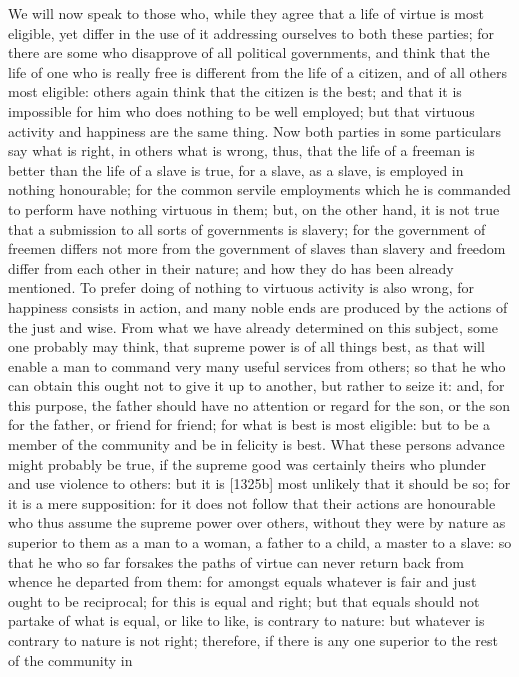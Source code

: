 We will now speak to those who, while they agree that a life of virtue is
most eligible, yet differ in the use of it addressing ourselves to both
these parties; for there are some who disapprove of all political
governments, and think that the life of one who is really free is
different from the life of a citizen, and of all others most eligible:
others again think that the citizen is the best; and that it is impossible
for him who does nothing to be well employed; but that virtuous activity
and happiness are the same thing. Now both parties in some particulars say
what is right, in others what is wrong, thus, that the life of a freeman
is better than the life of a slave is true, for a slave, as a slave, is
employed in nothing honourable; for the common servile employments which
he is commanded to perform have nothing virtuous in them; but, on the
other hand, it is not true that a submission to all sorts of governments
is slavery; for the government of freemen differs not more from the
government of slaves than slavery and freedom differ from each other in
their nature; and how they do has been already mentioned. To prefer doing
of nothing to virtuous activity is also wrong, for happiness consists in
action, and many noble ends are produced by the actions of the just and
wise. From what we have already determined on this subject, some one
probably may think, that supreme power is of all things best, as that will
enable a man to command very many useful services from others; so that he
who can obtain this ought not to give it up to another, but rather to
seize it: and, for this purpose, the father should have no attention or
regard for the son, or the son for the father, or friend for friend; for
what is best is most eligible: but to be a member of the community and be
in felicity is best. What these persons advance might probably be true, if
the supreme good was certainly theirs who plunder and use violence to
others: but it is [1325b] most unlikely that it should be so; for it is a
mere supposition: for it does not follow that their actions are honourable
who thus assume the supreme power over others, without they were by nature
as superior to them as a man to a woman, a father to a child, a master to
a slave: so that he who so far forsakes the paths of virtue can never
return back from whence he departed from them: for amongst equals whatever
is fair and just ought to be reciprocal; for this is equal and right; but
that equals should not partake of what is equal, or like to like, is
contrary to nature: but whatever is contrary to nature is not right;
therefore, if there is any one superior to the rest of the community in
